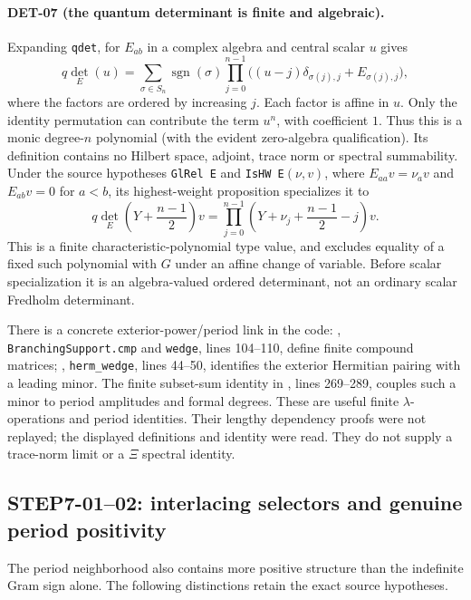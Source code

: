 \paragraph{DET-07 (the quantum determinant is finite and algebraic).}
Expanding \texttt{qdet}, for $E_{ab}$ in a complex algebra and central scalar $u$ gives
\[
 q\det_E(u)=\sum_{\sigma\in S_n}\operatorname{sgn}(\sigma)
 \prod_{j=0}^{n-1}\bigl((u-j)\delta_{\sigma(j),j}+E_{\sigma(j),j}\bigr),
\]
where the factors are ordered by increasing $j$. Each factor is affine in $u$. Only the identity permutation can contribute the term $u^n$, with coefficient $1$. Thus this is a monic degree-$n$ polynomial (with the evident zero-algebra qualification). Its definition contains no Hilbert space, adjoint, trace norm or spectral summability. Under the source hypotheses \texttt{GlRel E} and \texttt{IsHW E}$(\nu,v)$, where $E_{aa}v=\nu_a v$ and $E_{ab}v=0$ for $a<b$, its highest-weight proposition specializes it to
\[
 q\det_E\!\left(Y+\frac{n-1}{2}\right)v
 =\prod_{j=0}^{n-1}\left(Y+\nu_j+\frac{n-1}{2}-j\right)v.
\]
This is a finite characteristic-polynomial type value, and  excludes equality of a fixed such polynomial with $G$ under an affine change of variable. Before scalar specialization it is an algebra-valued ordered determinant, not an ordinary scalar Fredholm determinant.

There is a concrete exterior-power/period link in the code: , \texttt{BranchingSupport.cmp} and \texttt{wedge}, lines 104--110, define finite compound matrices; , \texttt{herm\_wedge}, lines 44--50, identifies the exterior Hermitian pairing with a leading minor. The finite subset-sum identity in , lines 269--289, couples such a minor to period amplitudes and formal degrees. These are useful finite $\lambda$-operations and period identities. Their lengthy dependency proofs were not replayed; the displayed definitions and identity were read. They do not supply a trace-norm limit or a $\Xi$ spectral identity.

\subsection{STEP7-01--02: interlacing selectors and genuine period positivity}
The period neighborhood also contains more positive structure than the indefinite Gram sign alone. The following distinctions retain the exact source hypotheses.

